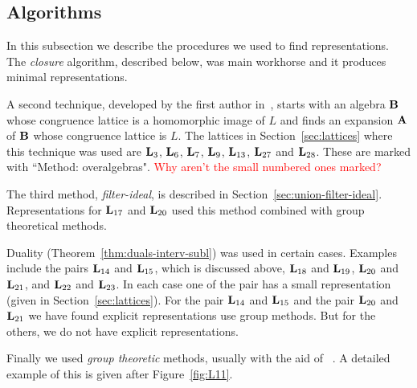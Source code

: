 {%

\subsection{Algorithms}\label{sec:algorithms}
In this subsection we describe the procedures we used to 
find representations. The \emph{closure} algorithm, described below,
was main workhorse and it produces minimal representations. 

A second technique, developed by the first author in~\cite{DeMeo2013},
starts with an algebra $\mathbf{B}$ whose congruence lattice is
a homomorphic image of $L$ and finds an expansion $\mathbf{A}$ of $\mathbf{B}$
whose congruence lattice is $L$.
The lattices in Section~\ref{sec:lattices} where this 
technique was used are 
$\mathbf{L}_3$, $\mathbf{L}_6$, $\mathbf{L}_7$, $\mathbf{L}_9$,
$\mathbf{L}_{13}$, $\mathbf{L}_{27}$ and $\mathbf{L}_{28}$. These are marked with 
``Method: overalgebras". \textcolor{red}{Why aren't the small
numbered ones marked?}


The third method, \emph{filter-ideal}, is described in 
Section~\ref{sec:union-filter-ideal}. Representations 
for $\mathbf{L}_{17}$ and $\mathbf{L}_{20}$ used this method combined
with group theoretical methods.


Duality (Theorem~\ref{thm:duals-interv-subl}) was used in 
certain cases. Examples include the pairs 
$\mathbf{L}_{14}$ and $\mathbf{L}_{15}$, which is discussed above,
$\mathbf{L}_{18}$ and $\mathbf{L}_{19}$,
$\mathbf{L}_{20}$ and $\mathbf{L}_{21}$, and
$\mathbf{L}_{22}$ and $\mathbf{L}_{23}$.
In each case one of the pair has a small representation (given
in Section~\ref{sec:lattices}). For the pair
$\mathbf{L}_{14}$ and $\mathbf{L}_{15}$ and the pair 
$\mathbf{L}_{20}$ and $\mathbf{L}_{21}$ we have found explicit representations
use group methods. But for the others, we do not have 
explicit representations.


Finally we used \emph{group theoretic} methods, usually with the aid
of \gap~\cite{GAP4}.  A detailed example of this is given after
Figure~\ref{fig:L11}.

}
